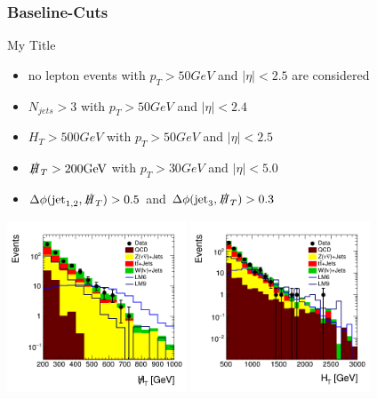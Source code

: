  
\begin{frame}
	\frametitle{Baseline-Cuts}
	\begin{block}{My Title}
		\begin{itemize}
			\item no lepton events with  $p_T > 50 \si{ GeV}$ and $\lvert\eta\rvert < 2.5$ are considered
			\item $N_{\si{jets}} > 3$ with $p_T > 50 \si{ GeV}$ and $\lvert\eta\rvert < 2.4$
			\item $H_T > 500\si{GeV}$ with $p_T > 50 \si{ GeV}$ and $\lvert\eta\rvert < 2.5$
			\item $\slashed{H}_T > 200\si{GeV}$ with $p_T > 30 \si{GeV}$ and $\lvert\eta\rvert < 5.0$	
			\item $\Delta\phi(\si{jet}_{1,2},\slashed{H}_T) > 0.5$ and  $\Delta\phi(\si{jet}_3,\slashed{H}_T) > 0.3$
		\end{itemize}
	\end{block}
	
		\begin{center}
		\includegraphics[width = 0.4\textwidth]{plots10/hDataVsMC_Mht.png}
		\includegraphics[width = 0.4\textwidth]{plots10/hDataVsMC_Ht.png}
	\end{center}
\end{frame}


